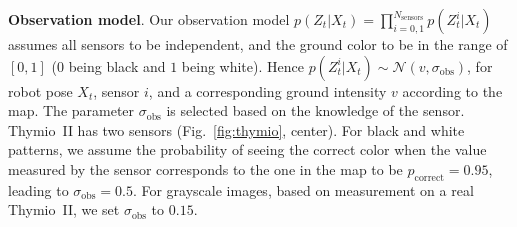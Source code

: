 \documentclass{svmult}
\newcommand{\fig}[1]{Fig.~\ref{fig:#1}}
\begin{document}
\textbf{Observation model}.
Our observation model $p(Z_t | X_t) = \prod_{i=0,1}^{N_\mathrm{sensors}} p(Z_t^{i} | X_t)$ assumes all sensors to be independent, and the ground color to be in the range of $[0,1]$ ($0$ being black and $1$ being white).
Hence $p(Z_t^{i} | X_t) \sim \mathcal{N}(v,\sigma_\mathrm{obs})$, for robot pose $X_t$, sensor $i$, and a corresponding ground intensity $v$ according to the map.
The parameter $\sigma_\mathrm{obs}$ is selected based on the knowledge of the sensor.
Thymio~II has two sensors (\fig{thymio}, center).
For black and white patterns, we assume the probability of seeing the correct color when the value measured by the sensor corresponds to the one in the map to be $p_\mathrm{correct} = 0.95$, leading to $\sigma_\mathrm{obs} = 0.5$.
For grayscale images, based on measurement on a real Thymio~II, we set $\sigma_\mathrm{obs}$ to $0.15$.

\end{document}
